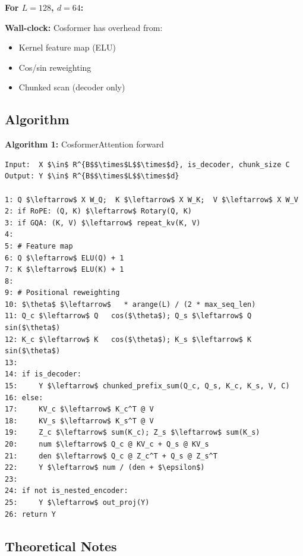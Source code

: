 \textbf{For $L = 128$, $d = 64$:}
\textbf{Wall-clock:} Cosformer has overhead from:
\begin{itemize}
\item Kernel feature map (ELU)
\item Cos/sin reweighting
\item Chunked scan (decoder only)

\end{itemize}
\subsection{Algorithm}

\textbf{Algorithm 1:} CosformerAttention forward
\begin{lstlisting}
Input:  X $\in$ R^{B$$\times$L$$\times$d}, is_decoder, chunk_size C
Output: Y $\in$ R^{B$$\times$L$$\times$d}

1: Q $\leftarrow$ X W_Q;  K $\leftarrow$ X W_K;  V $\leftarrow$ X W_V
2: if RoPE: (Q, K) $\leftarrow$ Rotary(Q, K)
3: if GQA: (K, V) $\leftarrow$ repeat_kv(K, V)
4:
5: # Feature map
6: Q $\leftarrow$ ELU(Q) + 1
7: K $\leftarrow$ ELU(K) + 1
8:
9: # Positional reweighting
10: $\theta$ $\leftarrow$   * arange(L) / (2 * max_seq_len)
11: Q_c $\leftarrow$ Q   cos($\theta$); Q_s $\leftarrow$ Q   sin($\theta$)
12: K_c $\leftarrow$ K   cos($\theta$); K_s $\leftarrow$ K   sin($\theta$)
13:
14: if is_decoder:
15:     Y $\leftarrow$ chunked_prefix_sum(Q_c, Q_s, K_c, K_s, V, C)
16: else:
17:     KV_c $\leftarrow$ K_c^T @ V
18:     KV_s $\leftarrow$ K_s^T @ V
19:     Z_c $\leftarrow$ sum(K_c); Z_s $\leftarrow$ sum(K_s)
20:     num $\leftarrow$ Q_c @ KV_c + Q_s @ KV_s
21:     den $\leftarrow$ Q_c @ Z_c^T + Q_s @ Z_s^T
22:     Y $\leftarrow$ num / (den + $\epsilon$)
23:
24: if not is_nested_encoder:
25:     Y $\leftarrow$ out_proj(Y)
26: return Y
\end{lstlisting}

\subsection{Theoretical Notes}

